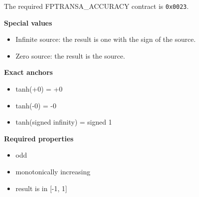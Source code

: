 The required FPTRANSA\_ACCURACY contract is \texttt{0x0023}.

\textbf{Special values}\par
\begin{itemize}
\item Infinite source: the result is one with the sign of the source.
\item Zero source: the result is the source.
\end{itemize}

\textbf{Exact anchors}\par
\begin{itemize}
\item tanh(+0) = +0
\item tanh(-0) = -0
\item tanh(signed infinity) = signed 1
\end{itemize}

\textbf{Required properties}\par
\begin{itemize}
\item odd
\item monotonically increasing
\item result is in [-1, 1]
\end{itemize}
